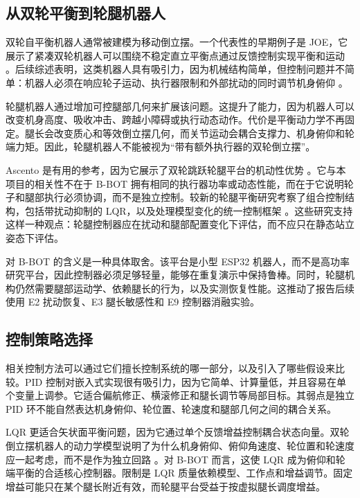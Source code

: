 \documentclass[12pt, a4paper]{article}
\begin{document}
\subsection{从双轮平衡到轮腿机器人}

双轮自平衡机器人通常被建模为移动倒立摆。一个代表性的早期例子是 JOE，它展示了紧凑双轮机器人可以围绕不稳定直立平衡点通过反馈控制实现平衡和运动 \cite{grasser2002joe}。后续综述表明，这类机器人具有吸引力，因为机械结构简单，但控制问题并不简单：机器人必须在响应轮子运动、执行器限制和外部扰动的同时调节机身俯仰 \cite{chan2013review}。

轮腿机器人通过增加可控腿部几何来扩展该问题。这提升了能力，因为机器人可以改变机身高度、吸收冲击、跨越小障碍或执行动态动作。代价是平衡动力学不再固定。腿长会改变质心和等效倒立摆几何，而关节运动会耦合支撑力、机身俯仰和轮端力矩。因此，轮腿机器人不能被视为“带有额外执行器的双轮倒立摆”。

Ascento 是有用的参考，因为它展示了双轮跳跃轮腿平台的机动性优势 \cite{klemm2019ascento}。它与本项目的相关性不在于 B-BOT 拥有相同的执行器功率或动态性能，而在于它说明轮子和腿部执行必须协调，而不是独立控制。较新的轮腿平衡研究考察了组合控制结构，包括带扰动抑制的 LQR，以及处理模型变化的统一控制框架 \cite{feng2023wheellegged,xin2025unified}。这些研究支持这样一种观点：轮腿控制器应在扰动和腿部配置变化下评估，而不应只在静态站立姿态下评估。

对 B-BOT 的含义是一种具体取舍。该平台是小型 ESP32 机器人，而不是高功率研究平台，因此控制器必须足够轻量，能够在重复演示中保持鲁棒。同时，轮腿机构仍然需要腿部运动学、依赖腿长的行为，以及实测恢复性能。这推动了报告后续使用 E2 扰动恢复、E3 腿长敏感性和 E9 控制器消融实验。

\subsection{控制策略选择}

相关控制方法可以通过它们擅长控制系统的哪一部分，以及引入了哪些假设来比较。PID 控制对嵌入式实现很有吸引力，因为它简单、计算量低，并且容易在单个变量上调参。它适合偏航修正、横滚修正和腿长调节等局部目标。其弱点是独立 PID 环不能自然表达机身俯仰、轮位置、轮速度和腿部几何之间的耦合关系。

LQR 更适合矢状面平衡问题，因为它通过单个反馈增益控制耦合状态向量。双轮倒立摆机器人的动力学模型说明了为什么机身俯仰、俯仰角速度、轮位置和轮速度应一起考虑，而不是作为独立回路 \cite{kim2015dynamic}。对 B-BOT 而言，这使 LQR 成为俯仰和轮端平衡的合适核心控制器。限制是 LQR 质量依赖模型、工作点和增益调节。固定增益可能只在某个腿长附近有效，而轮腿平台受益于按虚拟腿长调度增益。
\end{document}
